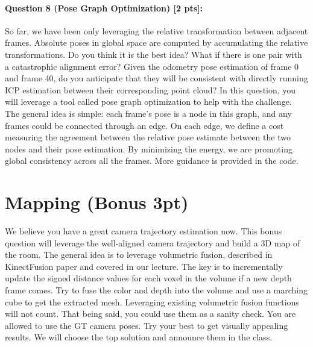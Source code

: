 \documentclass[11pt]{article}
\begin{document}
\paragraph{Question 8 (Pose Graph Optimization) [2 pts]:}
So far, we have been only leveraging the relative transformation between adjacent frames. Absolute poses in global space are computed by accumulating the relative transformations. Do you think it is the best idea? What if there is one pair with a catastrophic alignment error? Given the odometry pose estimation of frame 0 and frame 40, %
do you anticipate that they will be consistent with directly running ICP estimation between their corresponding point cloud? In this question, you will leverage a tool called pose graph optimization to help with the challenge. The general idea is simple: each frame's pose is a node in this graph, and any frames could be connected through an edge. On each edge, we define a cost measuring the agreement between the relative pose estimate between the two nodes and their pose estimation. By minimizing the energy, we are promoting global consistency across all the frames. More guidance is provided in the code.


\section*{Mapping (Bonus 3pt)}

We believe you have a great camera trajectory estimation now. This bonus question will leverage the well-aligned camera trajectory and build a 3D map of the room. The general idea is to leverage volumetric fusion, described in KinectFusion paper and covered in our lecture. The key is to incrementally update the signed distance values for each voxel in the volume if a new depth frame comes. Try to fuse the color and depth into the volume and use a marching cube to get the extracted mesh. Leveraging existing volumetric fusion functions will not count. That being said, you could use them as a sanity check. You are allowed to use the GT camera poses. Try your best to get visually appealing results. We will choose the top solution and announce them in the class. 
\end{document}
